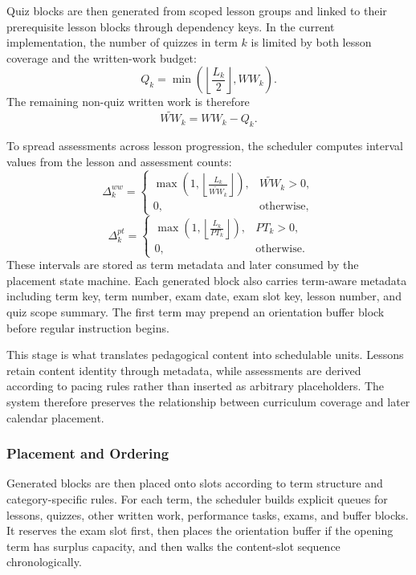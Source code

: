 \documentclass[conference]{IEEEtran}
\begin{document}
Quiz blocks are then generated from scoped lesson groups and linked to their
prerequisite lesson blocks through dependency keys. In the current implementation,
the number of quizzes in term \(k\) is limited by both lesson coverage and the
written-work budget:
\begin{equation}
Q_k=\min \left(\left\lfloor \frac{L_k}{2} \right\rfloor, WW_k \right).
\end{equation}
The remaining non-quiz written work is therefore
\begin{equation}
\widetilde{WW}_k = WW_k - Q_k.
\end{equation}

To spread assessments across lesson progression, the scheduler computes interval
values from the lesson and assessment counts:
\begin{equation}
\Delta^{ww}_k=
\begin{cases}
\max\left(1,\left\lfloor \frac{L_k}{\widetilde{WW}_k}\right\rfloor\right), & \widetilde{WW}_k > 0,\\
0, & \text{otherwise},
\end{cases}
\end{equation}
\begin{equation}
\Delta^{pt}_k=
\begin{cases}
\max\left(1,\left\lfloor \frac{L_k}{PT_k}\right\rfloor\right), & PT_k > 0,\\
0, & \text{otherwise}.
\end{cases}
\end{equation}
These intervals are stored as term metadata and later consumed by the placement
state machine. Each generated block also carries term-aware metadata including
term key, term number, exam date, exam slot key, lesson number, and quiz scope
summary. The first term may prepend an orientation buffer block before regular
instruction begins.

This stage is what translates pedagogical content into schedulable units. Lessons
retain content identity through metadata, while assessments are derived according
to pacing rules rather than inserted as arbitrary placeholders. The system
therefore preserves the relationship between curriculum coverage and later
calendar placement.

\subsubsection{Placement and Ordering}

Generated blocks are then placed onto slots according to term structure and
category-specific rules. For each term, the scheduler builds explicit queues for
lessons, quizzes, other written work, performance tasks, exams, and buffer
blocks. It reserves the exam slot first, then places the orientation buffer if
the opening term has surplus capacity, and then walks the content-slot sequence
chronologically.
\end{document}
